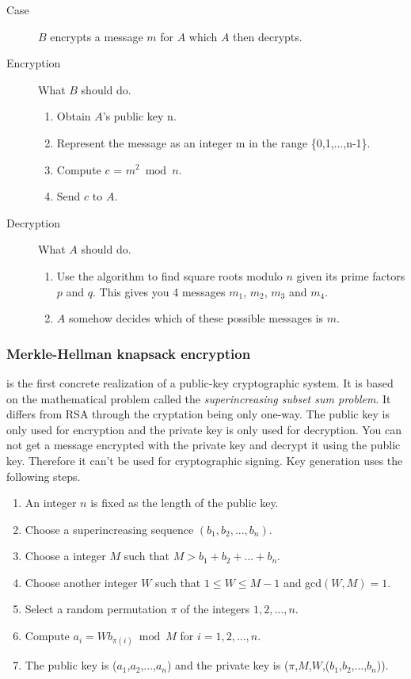 \documentclass{acm_proc_article-sp}
\begin{document}
    \begin{description}
    \item[Case] $B$ encrypts a message $m$ for $A$ which $A$ then decrypts.
    \item[Encryption] What $B$ should do.
    \begin{enumerate}
        \item Obtain $A$'s public key n.
        \item Represent the message as an integer m in the range \{0,1,...,n-1\}.
        \item Compute $c$ = $m^2 \bmod n$.
        \item Send $c$ to $A$.
    \end{enumerate}
    \item[Decryption] What $A$ should do.
    \begin{enumerate}
        \item Use the algorithm to find square roots modulo $n$ given its prime factors $p$ and $q$. This gives you 4 messages $m_1$, $m_2$, $m_3$ and $m_4$.
        \item $A$ somehow decides which of these possible messages is $m$.
    \end{enumerate}
    \end{description}
    
    \subsubsection{Merkle-Hellman knapsack encryption}
    is the first concrete realization of a public-key cryptographic system. It is based on the mathematical problem called the \textit{superincreasing subset sum problem}. It differs from RSA through the cryptation being only one-way. The public key is only used for encryption and the private key is only used for decryption. You can not get a message encrypted with the private key and decrypt it using the public key. Therefore it can't be used for cryptographic signing. Key generation uses the following steps.
    \begin{enumerate}
    \item An integer $n$ is fixed as the length of the public key.
    \item Choose a superincreasing sequence $(b_1,b_2,...,b_n)$.
    \item Choose a integer $M$ such that $M > b_1+b_2+...+b_n$.
    \item Choose another integer $W$ such that $1 \leq W \leq M - 1$ and gcd$(W,M) = 1$.
    \item Select a random permutation $\pi$ of the integers ${1,2,...,n}$.
    \item Compute $a_i = Wb_{\pi(i)} \bmod M$ for $i = 1,2,...,n$.
    \item The public key is ($a_1$,$a_2$,...,$a_n$) and the private key is ($\pi$,$M$,$W$,($b_1$,$b_2$,...,$b_n$)).
    \end{enumerate}
    
\end{document}
